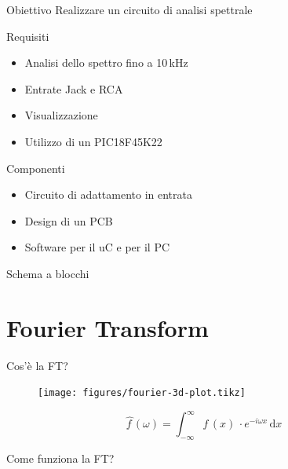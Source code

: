 \documentclass[10pt, xetex]{beamer}
\newcommand{\dd}[1]{\mathrm{d}#1}
\begin{document}
\begin{frame}{Obiettivo}
    Realizzare un circuito di analisi spettrale
    \begin{block}{Requisiti}
    \begin{itemize}
        \item Analisi dello spettro fino a 10\,kHz
        \item Entrate Jack e RCA
        \item Visualizzazione 
        \item Utilizzo di un PIC18F45K22
    \end{itemize}
    \end{block}
    
    \pause
    \begin{block}{Componenti}
    \begin{itemize}
        \item Circuito di adattamento in entrata
        \item Design di un PCB
        \item Software per il uC e per il PC
    \end{itemize}
    \end{block}
\end{frame}

\begin{frame}{Schema a blocchi}
    \begin{figure} \centering
    \end{figure}
\end{frame}

\section{Fourier Transform}
\begin{frame}{Cos'\`e la FT?}
    \begin{figure} \centering
        \texttt{[image: figures/fourier-3d-plot.tikz]}
    \end{figure}
    \[
        \hat{f\,} (\omega) 
        = \int_{-\infty}^\infty f\,(x)\,\cdot e^{-i\omega x}\,\dd{x}
    \]
\end{frame}

\begin{frame}{Come funziona la FT?}
\end{frame}
\end{document}
